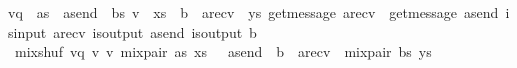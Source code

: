 \begin{isabellebody}
vq\ {\isacharequal}{\kern0pt}\ {\isacharparenleft}{\kern0pt}as\ {\isasymsqdot}\ a{\isacharunderscore}{\kern0pt}send\ {\isacharhash}{\kern0pt}\ bs{\isacharparenright}{\kern0pt}{\isacharsemicolon}{\kern0pt}\ v\ {\isacharequal}{\kern0pt}\ xs\ {\isasymsqdot}\ b\ {\isacharhash}{\kern0pt}\ a{\isacharunderscore}{\kern0pt}recv\ {\isacharhash}{\kern0pt}\ ys{\isacharsemicolon}{\kern0pt}\ get{\isacharunderscore}{\kern0pt}message\ a{\isacharunderscore}{\kern0pt}recv\ {\isacharequal}{\kern0pt}\ get{\isacharunderscore}{\kern0pt}message\ a{\isacharunderscore}{\kern0pt}send{\isacharsemicolon}{\kern0pt}\ is{\isacharunderscore}{\kern0pt}input\ a{\isacharunderscore}{\kern0pt}recv{\isacharsemicolon}{\kern0pt}\ is{\isacharunderscore}{\kern0pt}output\ a{\isacharunderscore}{\kern0pt}send{\isacharsemicolon}{\kern0pt}\ is{\isacharunderscore}{\kern0pt}output\ b{\isasymrbrakk}\ \isanewline
{\isasymLongrightarrow}\ mix{\isacharunderscore}{\kern0pt}shuf\ vq\ v\ v{\isacharprime}{\kern0pt}\ {\isacharparenleft}{\kern0pt}{\isacharparenleft}{\kern0pt}mix{\isacharunderscore}{\kern0pt}pair\ as\ xs\ {\isacharbrackleft}{\kern0pt}{\isacharbrackright}{\kern0pt}{\isacharparenright}{\kern0pt}\ {\isasymsqdot}\ a{\isacharunderscore}{\kern0pt}send\ {\isacharhash}{\kern0pt}\ b\ {\isacharhash}{\kern0pt}\ a{\isacharunderscore}{\kern0pt}recv\ {\isacharhash}{\kern0pt}\ {\isacharparenleft}{\kern0pt}mix{\isacharunderscore}{\kern0pt}pair\ bs\ ys\ {\isacharbrackleft}{\kern0pt}{\isacharbrackright}{\kern0pt}{\isacharparenright}{\kern0pt}{\isacharparenright}{\kern0pt}{\isachardoublequoteclose}\isanewline
\isanewline
\isanewline
\isanewline
{}\isamarkupfalse%
\isanewline
%
\isadelimtheory
%
\endisadelimtheory
%
\isatagtheory
{}\isamarkupfalse%
%
\endisatagtheory
{\isafoldtheory}%
%
\isadelimtheory
%
\endisadelimtheory
%
\end{isabellebody}%
\endinput
